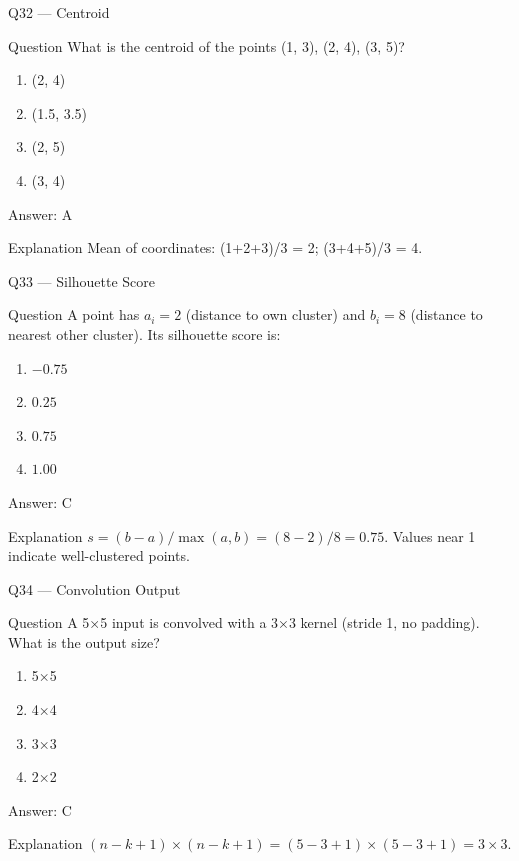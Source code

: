 \documentclass[aspectratio=169,8pt]{beamer}
\begin{document}
	\begin{frame}{Q32 --- Centroid}
		\begin{block}{Question}
			What is the centroid of the points (1, 3), (2, 4), (3, 5)?
		\end{block}
		\begin{enumerate}
			\item (2, 4)
			\item (1.5, 3.5)
			\item (2, 5)
			\item (3, 4)
		\end{enumerate}
		\begin{exampleblock}{Answer: A}\end{exampleblock}
		\begin{block}{Explanation}
			Mean of coordinates: (1+2+3)/3 = 2; (3+4+5)/3 = 4.
		\end{block}
	\end{frame}
	
	\begin{frame}{Q33 --- Silhouette Score}
		\begin{block}{Question}
			A point has $a_i = 2$ (distance to own cluster) and $b_i = 8$ (distance to nearest other cluster). Its silhouette score is:
		\end{block}
		\begin{enumerate}
			\item $-0.75$
			\item $0.25$
			\item $0.75$
			\item $1.00$
		\end{enumerate}
		\begin{exampleblock}{Answer: C}\end{exampleblock}
		\begin{block}{Explanation}
			$s=(b-a)/\max(a,b)=(8-2)/8=0.75$. Values near 1 indicate well-clustered points.
		\end{block}
	\end{frame}
	
	\begin{frame}{Q34 --- Convolution Output}
		\begin{block}{Question}
			A 5×5 input is convolved with a 3×3 kernel (stride 1, no padding). What is the output size?
		\end{block}
		\begin{enumerate}
			\item 5×5
			\item 4×4
			\item 3×3
			\item 2×2
		\end{enumerate}
		\begin{exampleblock}{Answer: C}\end{exampleblock}
		\begin{block}{Explanation}
			$(n-k+1)\times(n-k+1)=(5-3+1)\times(5-3+1)=3\times 3$.
		\end{block}
	\end{frame}
	
\end{document}
